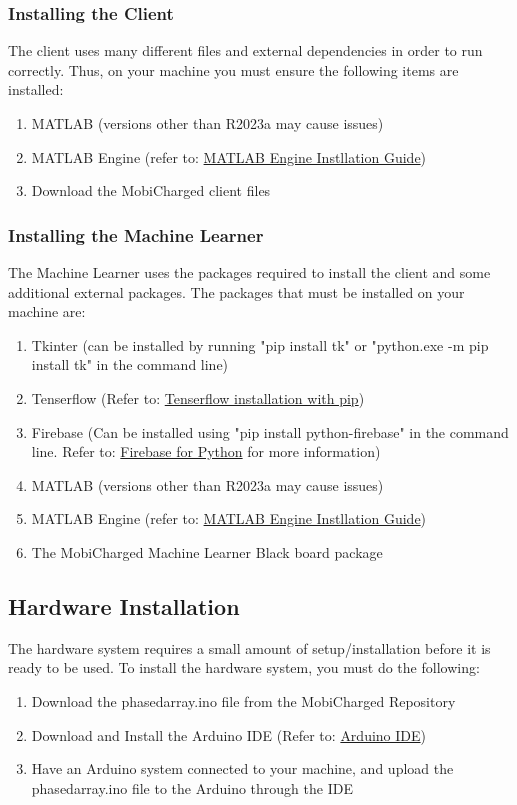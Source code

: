 \documentclass[12pt, titlepage]{article}
\begin{document}
\subsubsection{Installing the Client}
The client uses many different files and external dependencies in order to run correctly. Thus, on your machine you must ensure the following items are installed:
\begin{enumerate}
    \item MATLAB (versions other than R2023a may cause issues)
    \item MATLAB Engine (refer to: \href{https://www.mathworks.com/help/matlab/matlab_external/install-the-matlab-engine-for-python.html}{MATLAB Engine Instllation Guide})
    \item Download the MobiCharged client files
\end{enumerate}

\subsubsection{Installing the Machine Learner}
The Machine Learner uses the packages required to install the client and some additional external packages. The packages that must be installed on your machine are:
\begin{enumerate}
    \item Tkinter (can be installed by running "pip install tk" or "python.exe -m pip install tk" in the command line)
    \item Tenserflow (Refer to: \href{https://www.tensorflow.org/install/pip}{Tenserflow installation with pip})
    \item Firebase (Can be installed using "pip install python-firebase" in the command line. Refer to: \href{https://pypi.org/project/python-firebase/}{Firebase for Python} for more information)
    \item MATLAB (versions other than R2023a may cause issues)
    \item MATLAB Engine (refer to: \href{https://www.mathworks.com/help/matlab/matlab_external/install-the-matlab-engine-for-python.html}{MATLAB Engine Instllation Guide})
    \item The MobiCharged Machine Learner Black board package 
\end{enumerate}

\subsection{Hardware Installation}
The hardware system requires a small amount of setup/installation before it is ready to be used. To install the hardware system, you must do the following:
\begin{enumerate}
    \item Download the phasedarray.ino file from the MobiCharged Repository
    \item Download and Install the Arduino IDE (Refer to: \href{https://www.arduino.cc/en/software}{Arduino IDE})
    \item Have an Arduino system connected to your machine, and upload the phasedarray.ino file to the Arduino through the IDE
\end{enumerate}
\end{document}
